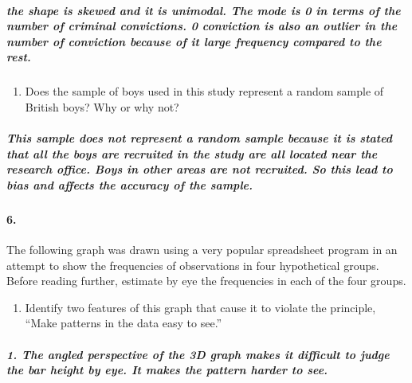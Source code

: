 \documentclass[]{article}
\providecommand{\tightlist}{%
  \setlength{\itemsep}{0pt}\setlength{\parskip}{0pt}}
\let\oldparagraph\paragraph
\renewcommand{\paragraph}[1]{\oldparagraph{#1}\mbox{}}
\let\oldsubparagraph\subparagraph
\renewcommand{\subparagraph}[1]{\oldsubparagraph{#1}\mbox{}}
\begin{document}
\subparagraph{the shape is skewed and it is unimodal. The mode is 0 in
terms of the number of criminal convictions. 0 conviction is also an
outlier in the number of conviction because of it large frequency
compared to the
rest.}\label{the-shape-is-skewed-and-it-is-unimodal.-the-mode-is-0-in-terms-of-the-number-of-criminal-convictions.-0-conviction-is-also-an-outlier-in-the-number-of-conviction-because-of-it-large-frequency-compared-to-the-rest.}

\begin{enumerate}
\def\labelenumi{\alph{enumi}.}
\setcounter{enumi}{6}
\tightlist
\item
  Does the sample of boys used in this study represent a random sample
  of British boys? Why or why not?
\end{enumerate}

\subparagraph{This sample does not represent a random sample because it
is stated that all the boys are recruited in the study are all located
near the research office. Boys in other areas are not recruited. So this
lead to bias and affects the accuracy of the
sample.}\label{this-sample-does-not-represent-a-random-sample-because-it-is-stated-that-all-the-boys-are-recruited-in-the-study-are-all-located-near-the-research-office.-boys-in-other-areas-are-not-recruited.-so-this-lead-to-bias-and-affects-the-accuracy-of-the-sample.}

\paragraph{6.}\label{section-6}

The following graph was drawn using a very popular spreadsheet program
in an attempt to show the frequencies of observations in four
hypothetical groups. Before reading further, estimate by eye the
frequencies in each of the four groups.

\begin{enumerate}
\def\labelenumi{\alph{enumi}.}
\tightlist
\item
  Identify two features of this graph that cause it to violate the
  principle, ``Make patterns in the data easy to see.''
\end{enumerate}

\subparagraph{1. The angled perspective of the 3D graph makes it
difficult to judge the bar height by eye. It makes the pattern harder to
see.}\label{the-angled-perspective-of-the-3d-graph-makes-it-difficult-to-judge-the-bar-height-by-eye.-it-makes-the-pattern-harder-to-see.}
\end{document}
